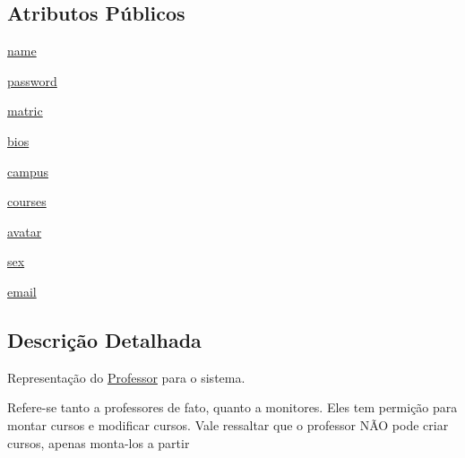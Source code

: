 \subsection*{Atributos Públicos}
\begin{DoxyCompactItemize}
\item 
\hyperlink{classELO_1_1EntityUnit_1_1Professor_ae85cc0fc9c64a277111a85e87efbe049}{name}
\item 
\hyperlink{classELO_1_1EntityUnit_1_1Professor_af0810854479e9f9a806eb6bfe7468e60}{password}
\item 
\hyperlink{classELO_1_1EntityUnit_1_1Professor_afc64d3f1b0e7c88530c7ee62f67ef671}{matric}
\item 
\hyperlink{classELO_1_1EntityUnit_1_1Professor_a2e403e0bfc353dcdf9988140d61d5ca7}{bios}
\item 
\hyperlink{classELO_1_1EntityUnit_1_1Professor_ad95cfc8959dcb02a6afff422703d4dde}{campus}
\item 
\hyperlink{classELO_1_1EntityUnit_1_1Professor_a6eb0d2789bb8750fb275aca0f8bb74bb}{courses}
\item 
\hyperlink{classELO_1_1EntityUnit_1_1Professor_a593a0636e87dcdd9ced2e6b7494a45dc}{avatar}
\item 
\hyperlink{classELO_1_1EntityUnit_1_1Professor_ac049dc360c4af27037158e33577288e1}{sex}
\item 
\hyperlink{classELO_1_1EntityUnit_1_1Professor_a7c6f76f185515050334dc74a030043a7}{email}
\end{DoxyCompactItemize}


\subsection{Descrição Detalhada}
Representação do \hyperlink{classELO_1_1EntityUnit_1_1Professor}{Professor} para o sistema. 

Refere-\/se tanto a professores de fato, quanto a monitores. Eles tem permição para montar cursos e modificar cursos. Vale ressaltar que o professor NÃ\-O pode criar cursos, apenas monta-\/los a partir 

